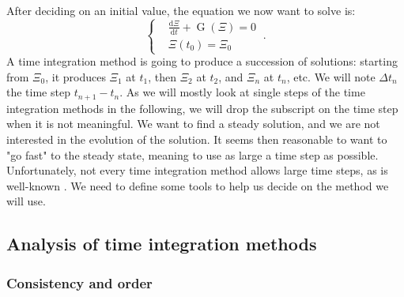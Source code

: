     \paragraph{}
    After deciding on an initial value, the equation we now want to solve is:
    \begin{equation}\label{eq:init_value_ode}
      \left\{\begin{aligned}
        & \frac{\mathrm{d} \Xi}{\mathrm{d}t} + \operatorname{G}\left(\Xi\right) = 0 \\
        & \Xi\left(t_0\right) = \Xi_0
      \end{aligned}\right. \ .
    \end{equation}
    A time integration method is going to produce a succession of solutions: starting from $\Xi_0$, it produces $\Xi_1$ at $t_1$, then $\Xi_2$ at $t_2$, and $\Xi_n$ at $t_n$, etc.
    We will note $\Delta t_n$ the time step $t_{n+1} - t_n$.
    As we will mostly look at single steps of the time integration methods in the following, we will drop the subscript on the time step when it is not meaningful.
    We want to find a steady solution, and we are not interested in the evolution of the solution.
    It seems then reasonable to want to "go fast" to the steady state, meaning to use as large a time step as possible.
    Unfortunately, not every time integration method allows large time steps, as is well-known \cite{CourantFriedrichsLewy1967}.
    We need to define some tools to help us decide on the method we will use.


    \subsection{Analysis of time integration methods}

      \subsubsection{Consistency and order}

